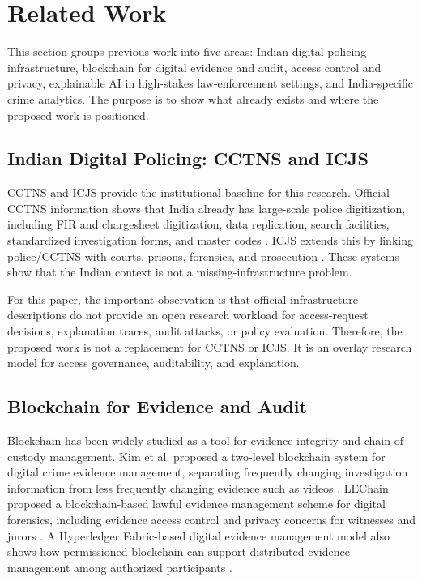 \section{Related Work}

This section groups previous work into five areas: Indian digital policing infrastructure, blockchain for digital evidence and audit, access control and privacy, explainable AI in high-stakes law-enforcement settings, and India-specific crime analytics. The purpose is to show what already exists and where the proposed work is positioned.

\subsection{Indian Digital Policing: CCTNS and ICJS}

CCTNS and ICJS provide the institutional baseline for this research. Official CCTNS information shows that India already has large-scale police digitization, including FIR and chargesheet digitization, data replication, search facilities, standardized investigation forms, and master codes \cite{pib_cctns_2026}. ICJS extends this by linking police/CCTNS with courts, prisons, forensics, and prosecution \cite{mha_icjs_2026}. These systems show that the Indian context is not a missing-infrastructure problem.

For this paper, the important observation is that official infrastructure descriptions do not provide an open research workload for access-request decisions, explanation traces, audit attacks, or policy evaluation. Therefore, the proposed work is not a replacement for CCTNS or ICJS. It is an overlay research model for access governance, auditability, and explanation.

\subsection{Blockchain for Evidence and Audit}

Blockchain has been widely studied as a tool for evidence integrity and chain-of-custody management. Kim et al. proposed a two-level blockchain system for digital crime evidence management, separating frequently changing investigation information from less frequently changing evidence such as videos \cite{kim_two_level_2021}. LEChain proposed a blockchain-based lawful evidence management scheme for digital forensics, including evidence access control and privacy concerns for witnesses and jurors \cite{li_lechain_2021}. A Hyperledger Fabric-based digital evidence management model also shows how permissioned blockchain can support distributed evidence management among authorized participants \cite{jeong_fabric_evidence_2020}.

